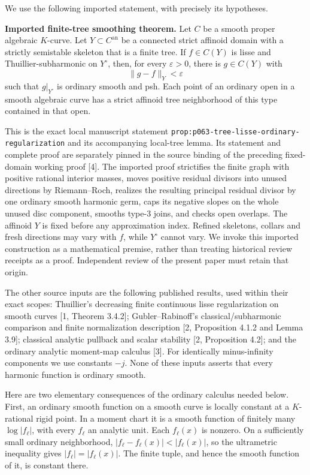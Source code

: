 \documentclass[
  11pt,
]{article}
\begin{document}
We use the following imported statement, with precisely its hypotheses.

\textbf{Imported finite-tree smoothing theorem.} Let \(C\) be a smooth
proper algebraic \(K\)-curve. Let \(Y\subset C^{\mathrm{an}}\) be a
connected strict affinoid domain with a strictly semistable skeleton
that is a finite tree. If \(f\in C(Y)\) is lisse and
Thuillier-subharmonic on \(Y^\circ\), then, for every \(\varepsilon>0\),
there is \(g\in C(Y)\) with \[
\|g-f\|_Y<\varepsilon
\] such that \(g|_{Y^\circ}\) is ordinary smooth and psh. Each point of
an ordinary open in a smooth algebraic curve has a strict affinoid tree
neighborhood of this type contained in that open.

This is the exact local manuscript statement
\texttt{prop:p063-tree-lisse-ordinary-regularization} and its
accompanying local-tree lemma. Its statement and complete proof are
separately pinned in the source binding of the preceding fixed-domain
working proof {[}4{]}. The imported proof strictifies the finite graph
with positive rational interior masses, moves positive residual divisors
into unused directions by Riemann--Roch, realizes the resulting
principal residual divisor by one ordinary smooth harmonic germ, caps
its negative slopes on the whole unused disc component, smooths type-3
joins, and checks open overlaps. The affinoid \(Y\) is fixed before any
approximation index. Refined skeletons, collars and fresh directions may
vary with \(f\), while \(Y^\circ\) cannot vary. We invoke this imported
construction as a mathematical premise, rather than treating historical
review receipts as a proof. Independent review of the present paper must
retain that origin.

The other source inputs are the following published results, used within
their exact scopes: Thuillier's decreasing finite continuous lisse
regularization on smooth curves {[}1, Theorem 3.4.2{]};
Gubler--Rabinoff's classical/subharmonic comparison and finite
normalization description {[}2, Proposition 4.1.2 and Lemma 3.9{]};
classical analytic pullback and scalar stability {[}2, Proposition
4.2{]}; and the ordinary analytic moment-map calculus {[}3{]}. For
identically minus-infinity components we use constants \(-j\). None of
these inputs asserts that every harmonic function is ordinary smooth.

Here are two elementary consequences of the ordinary calculus needed
below. First, an ordinary smooth function on a smooth curve is locally
constant at a \(K\)-rational rigid point. In a moment chart it is a
smooth function of finitely many \(\log|f_\ell|\), with every \(f_\ell\)
an analytic unit. Each \(f_\ell(x)\) is nonzero. On a sufficiently small
ordinary neighborhood, \(|f_\ell-f_\ell(x)|<|f_\ell(x)|\), so the
ultrametric inequality gives \(|f_\ell|=|f_\ell(x)|\). The finite tuple,
and hence the smooth function of it, is constant there.
\end{document}
